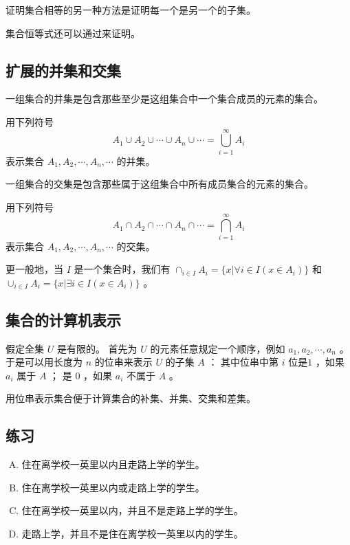 {{        证明集合相等的另一种方法是证明每一个是另一个的子集。

        集合恒等式还可以通过来证明。
    }

    \subsection{扩展的并集和交集}
    {
        \begin{defines}
            一组集合的并集是包含那些至少是这组集合中一个集合成员的元素的集合。
        \end{defines}

        用下列符号
        $$A_1 \cup A_2 \cup \cdots \cup A_n \cup \cdots = \bigcup_{i = 1}^{\infty} A_i$$
        表示集合 $A_1, A_2, \cdots , A_n, \cdots$ 的并集。

        \begin{defines}
            一组集合的交集是包含那些属于这组集合中所有成员集合的元素的集合。
        \end{defines}

        用下列符号
        $$A_1 \cap A_2 \cap \cdots \cap A_n \cap \cdots = \bigcap_{i = 1}^{\infty} A_i$$
        表示集合 $A_1, A_2, \cdots , A_n, \cdots$ 的交集。

        更一般地，当 $I$ 是一个集合时，我们有 $\cap_{i \in I} A_i = \{x | \forall i \in I (x \in A_i)\}$ 和 $\cup_{i \in I} A_i = \{x | \exists i \in I (x \in A_i)\}$ 。
    }

    \subsection{集合的计算机表示}
    {
        假定全集 $U$ 是有限的。
        首先为 $U$ 的元素任意规定一个顺序，例如 $a_1, a_2, \cdots , a_n$ 。
        于是可以用长度为 $n$ 的位串来表示 $U$ 的子集 $A$ ：
        其中位串中第 $i$ 位是$1$ ，如果 $a_i$ 属于 $A$ ；
        是 $0$ ，如果 $a_i$ 不属于 $A$ 。

        用位串表示集合便于计算集合的补集、并集、交集和差集。
    }

    \subsection{练习}
    {
        \begin{practices}
            \begin{enumerate}[A.]
                \item 住在离学校一英里以内且走路上学的学生。
                \item 住在离学校一英里以内或走路上学的学生。
                \item 住在离学校一英里以内，并且不是走路上学的学生。
                \item 走路上学，并且不是住在离学校一英里以内的学生。
            \end{enumerate}
        \end{practices}

}}
